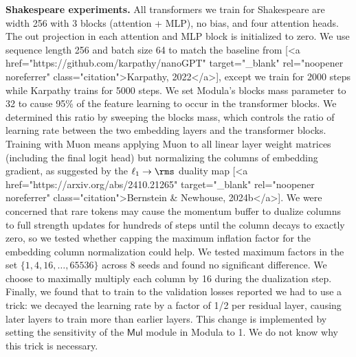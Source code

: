 \textbf{Shakespeare experiments.} All transformers we train for Shakespeare are width 256 with 3 blocks (attention + MLP), no bias, and four attention heads. The out projection in each attention and MLP block is initialized to zero. We use sequence length 256 and batch size 64 to match the baseline from [<a href="https://github.com/karpathy/nanoGPT" target="_blank" rel="noopener noreferrer" class="citation">Karpathy, 2022</a>], except we train for 2000 steps while Karpathy trains for 5000 steps. We set Modula's blocks mass parameter to 32 to cause 95\% of the feature learning to occur in the transformer blocks. We determined this ratio by sweeping the blocks mass, which controls the ratio of learning rate between the two embedding layers and the transformer blocks. Training with Muon means applying Muon to all linear layer weight matrices (including the final logit head) but normalizing the columns of embedding gradient, as suggested by the $\ell_1 \to \rms$ duality map [<a href="https://arxiv.org/abs/2410.21265" target="_blank" rel="noopener noreferrer" class="citation">Bernstein & Newhouse, 2024b</a>]. We were concerned that rare tokens may cause the momentum buffer to dualize columns to full strength updates for hundreds of steps until the column decays to exactly zero, so we tested whether capping the maximum inflation factor for the embedding column normalization could help. We tested maximum factors in the set $\{1, 4, 16, \dots, 65536\}$ across 8 seeds and found no significant difference. We choose to maximally multiply each column by 16 during the dualization step. Finally, we found that to train to the validation losses reported we had to use a trick: we decayed the learning rate by a factor of 1/2 per residual layer, causing later layers to train more than earlier layers. This change is implemented by setting the sensitivity of the $\mathsf{Mul}$ module in Modula to 1. We do not know why this trick is necessary.

